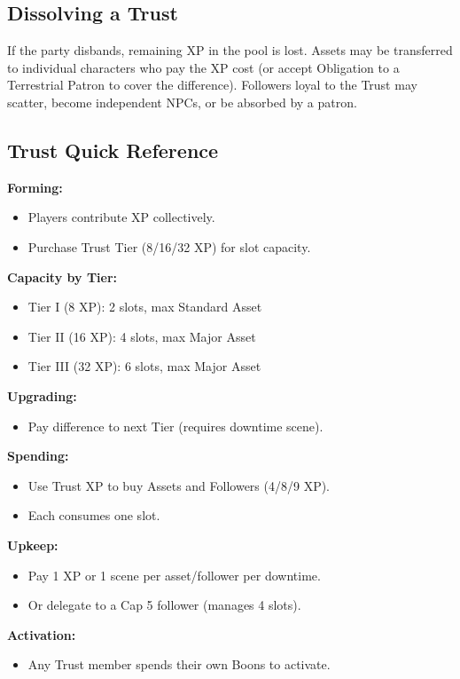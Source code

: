\subsection{Dissolving a Trust}

If the party disbands, remaining XP in the pool is lost. Assets may be transferred to individual characters who pay the XP cost (or accept Obligation to a Terrestrial Patron to cover the difference). Followers loyal to the Trust may scatter, become independent NPCs, or be absorbed by a patron.

\subsection{Trust Quick Reference}

\begin{tcolorbox}[colback=gray!5!white,colframe=gray!75!black,title=Trusts Summary,fonttitle=\bfseries,breakable]
\textbf{Forming:}
\begin{itemize}
  \item Players contribute XP collectively.
  \item Purchase Trust Tier (8/16/32 XP) for slot capacity.
\end{itemize}

\textbf{Capacity by Tier:}
\begin{itemize}
  \item Tier I (8 XP): 2 slots, max Standard Asset
  \item Tier II (16 XP): 4 slots, max Major Asset
  \item Tier III (32 XP): 6 slots, max Major Asset
\end{itemize}

\textbf{Upgrading:}
\begin{itemize}
  \item Pay difference to next Tier (requires downtime scene).
\end{itemize}

\textbf{Spending:}
\begin{itemize}
  \item Use Trust XP to buy Assets and Followers (4/8/9 XP).
  \item Each consumes one slot.
\end{itemize}

\textbf{Upkeep:}
\begin{itemize}
  \item Pay 1 XP or 1 scene per asset/follower per downtime.
  \item Or delegate to a Cap 5 follower (manages 4 slots).
\end{itemize}

\textbf{Activation:}
\begin{itemize}
  \item Any Trust member spends their own Boons to activate.
\end{itemize}
\end{tcolorbox}

